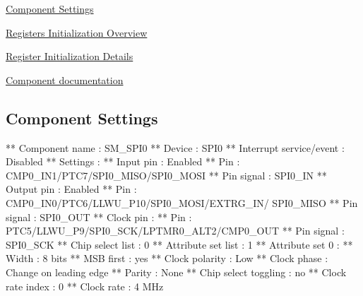 \begin{DoxyItemize}
\item \hyperlink{SM_SPI0_settings}{Component Settings}
\item \hyperlink{SM_SPI0_regs_overview}{Registers Initialization Overview}
\item \hyperlink{SM_SPI0_regs_details}{Register Initialization Details}
\item \hyperlink{group___s_m___s_p_i0__module}{Component documentation} 
\end{DoxyItemize}\hypertarget{SM_SPI0_settings}{}\subsection{Component Settings}\label{SM_SPI0_settings}

\begin{DoxyCode}
**          Component name                                 : SM\_SPI0
**          Device                                         : SPI0
**          Interrupt service/\textcolor{keyword}{event}                        : Disabled
**          Settings                                       : 
**            Input pin                                    : Enabled
**              Pin                                        : CMP0\_IN1/PTC7/SPI0\_MISO/SPI0\_MOSI
**              Pin signal                                 : SPI0\_IN
**            Output pin                                   : Enabled
**              Pin                                        : CMP0\_IN0/PTC6/LLWU\_P10/SPI0\_MOSI/EXTRG\_IN/
      SPI0\_MISO
**              Pin signal                                 : SPI0\_OUT
**            Clock pin                                    : 
**              Pin                                        : PTC5/LLWU\_P9/SPI0\_SCK/LPTMR0\_ALT2/CMP0\_OUT
**              Pin signal                                 : SPI0\_SCK
**            Chip select list                             : 0
**            Attribute set list                           : 1
**              Attribute set 0                            : 
**                Width                                    : 8 bits
**                MSB first                                : yes
**                Clock polarity                           : Low
**                Clock phase                              : Change on leading edge
**                Parity                                   : None
**                Chip select toggling                     : no
**                Clock rate index                         : 0
**            Clock rate                                   : 4 MHz

\end{DoxyCode}
